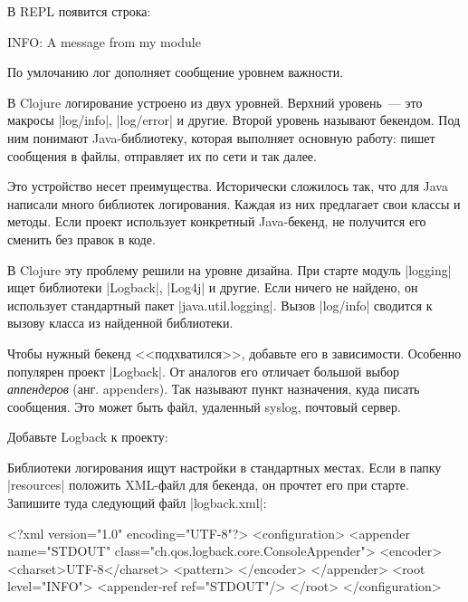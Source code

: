 \noindent
В REPL появится строка:

\begin{english}
  \begin{text}
INFO: A message from my module
  \end{text}
\end{english}

\noindent
По умлочанию лог дополняет сообщение уровнем важности.

В Clojure логирование устроено из двух уровней. Верхний уровень~--- это макросы
\spverb|log/info|, \spverb|log/error| и другие. Второй уровень называют
бекендом. Под ним понимают Java-библиотеку, которая выполняет основную работу:
пишет сообщения в файлы, отправляет их по сети и так далее.

Это устройство несет преимущества. Исторически сложилось так, что для Java
написали много библиотек логирования. Каждая из них предлагает свои классы и
методы. Если проект использует конкретный Java-бекенд, не получится его сменить
без правок в коде.

В Clojure эту проблему решили на уровне дизайна. При старте модуль
\spverb|logging| ищет библиотеки \spverb|Logback|, \spverb|Log4j| и другие. Если
ничего не найдено, он использует стандартный пакет
\spverb|java.util.logging|. Вызов \spverb|log/info| сводится к вызову класса из
найденной библиотеки.

Чтобы нужный бекенд <<подхватился>>, добавьте его в зависимости. Особенно
популярен проект \spverb|Logback|. От аналогов его отличает большой выбор
\emph{аппендеров} (анг. appenders). Так называют пункт назначения, куда писать
сообщения. Это может быть файл, удаленный syslog, почтовый сервер.

Добавьте Logback к проекту:

\begin{english}
  \begin{clojure}
  \end{clojure}
\end{english}

Библиотеки логирования ищут настройки в стандартных местах. Если в папку
\spverb|resources| положить XML-файл для бекенда, он прочтет его при
старте. Запишите туда следующий файл \spverb|logback.xml|:

\begin{english}
  \begin{xml}
<?xml version="1.0" encoding="UTF-8"?>
<configuration>
  <appender name="STDOUT" class="ch.qos.logback.core.ConsoleAppender">
    <encoder>
      <charset>UTF-8</charset>
      <pattern>%
    </encoder>
  </appender>
  <root level="INFO">
    <appender-ref ref="STDOUT"/>
  </root>
</configuration>
  \end{xml}
\end{english}

